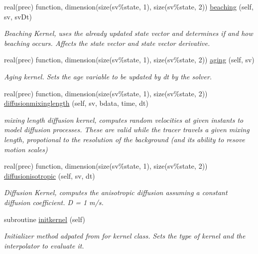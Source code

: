 \begin{DoxyCompactItemize}
real(prec) function, dimension(size(sv\%state, 1), size(sv\%state, 2)) \mbox{\hyperlink{namespacekernel__mod_ad243eaeb4e5d667795477e81ce6136c9}{beaching}} (self, sv, sv\+Dt)
\begin{DoxyCompactList}\small\item\em Beaching Kernel, uses the already updated state vector and determines if and how beaching occurs. Affects the state vector and state vector derivative. \end{DoxyCompactList}\item 
real(prec) function, dimension(size(sv\%state, 1), size(sv\%state, 2)) \mbox{\hyperlink{namespacekernel__mod_ac2352f3964b072607ed042e70a59b9f2}{aging}} (self, sv)
\begin{DoxyCompactList}\small\item\em Aging kernel. Sets the age variable to be updated by dt by the solver. \end{DoxyCompactList}\item 
real(prec) function, dimension(size(sv\%state, 1), size(sv\%state, 2)) \mbox{\hyperlink{namespacekernel__mod_a065d7965d3a572a524cfd6bdd4729898}{diffusionmixinglength}} (self, sv, bdata, time, dt)
\begin{DoxyCompactList}\small\item\em mixing length diffusion kernel, computes random velocities at given instants to model diffusion processes. These are valid while the tracer travels a given mixing length, propotional to the resolution of the background (and its ability to resove motion scales) \end{DoxyCompactList}\item 
real(prec) function, dimension(size(sv\%state, 1), size(sv\%state, 2)) \mbox{\hyperlink{namespacekernel__mod_a92805ef71e30527b27de4efd7561f8f7}{diffusionisotropic}} (self, sv, dt)
\begin{DoxyCompactList}\small\item\em Diffusion Kernel, computes the anisotropic diffusion assuming a constant diffusion coefficient. D = 1 m/s. \end{DoxyCompactList}\item 
subroutine \mbox{\hyperlink{namespacekernel__mod_a26c62a8eec723402e20142e68ba7ec65}{initkernel}} (self)
\begin{DoxyCompactList}\small\item\em Initializer method adpated from for kernel class. Sets the type of kernel and the interpolator to evaluate it. \end{DoxyCompactList}\end{DoxyCompactItemize}
